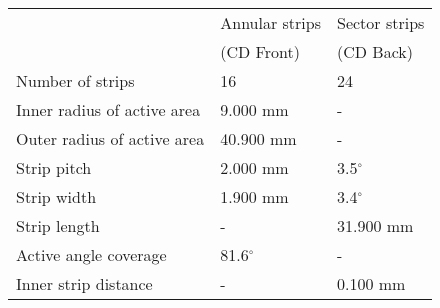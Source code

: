 \begin{tabular}{lll}
\hline
                            & Annular strips & Sector strips \\
		                    & (CD Front)     & (CD Back)     \\
\hline
Number of strips            & 16             & 24            \\
Inner radius of active area &  9.000 mm      & -             \\
Outer radius of active area & 40.900 mm      & -             \\
Strip pitch                 &  2.000 mm      & 3.5$^\circ$   \\
Strip width                 &  1.900 mm      & 3.4$^\circ$   \\
Strip length                &  -             & 31.900 mm     \\
Active angle coverage       & 81.6$^\circ$   & -             \\
Inner strip distance        &  -             & 0.100 mm      \\
\hline
\end{tabular}